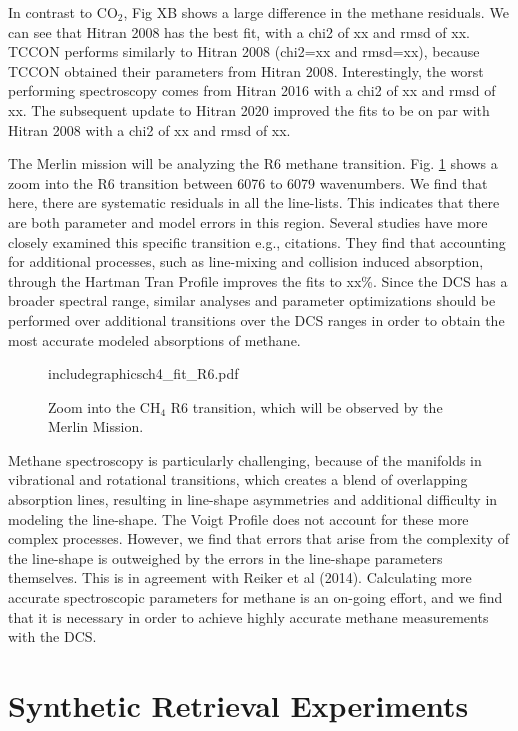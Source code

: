 \documentclass[amt, manuscript]{copernicus}
\begin{document}
In contrast to CO$_2$, Fig XB shows a large difference in the methane residuals. We can see that Hitran 2008 has the best fit, with a chi2 of xx and rmsd of xx. TCCON performs similarly to Hitran 2008 (chi2=xx and rmsd=xx), because TCCON obtained their parameters from Hitran 2008. Interestingly, the worst performing spectroscopy comes from Hitran 2016 with a chi2 of xx and rmsd of xx. The subsequent update to Hitran 2020 improved the fits to be on par with Hitran 2008 with a chi2 of xx and rmsd of xx.

The Merlin mission will be analyzing the R6 methane transition. Fig. \ref{fig:ch4_spectrum_r6} shows a zoom into the R6 transition between 6076 to 6079 wavenumbers. We find that here, there are systematic residuals in all the line-lists. This indicates that there are both parameter and model errors in this region. Several studies have more closely examined this specific transition e.g., citations. They find that accounting for additional processes, such as line-mixing and collision induced absorption, through the Hartman Tran Profile improves the fits to xx\%. Since the DCS has a broader spectral range, similar analyses and parameter optimizations should be performed over additional transitions over the DCS ranges in order to obtain the most accurate modeled absorptions of methane. 

\begin{figure}
  \centering
  includegraphics{ch4_fit_R6.pdf}
  \caption{Zoom into the CH$_4$ R6 transition, which will be observed by the Merlin Mission. }
  \label{fig:ch4_spectrum_r6}
\end{figure}
Methane spectroscopy is particularly challenging, because of the manifolds in vibrational and rotational transitions, which creates a blend of overlapping absorption lines, resulting in line-shape asymmetries and additional difficulty in modeling the line-shape. The Voigt Profile does not account for these more complex processes. However, we find that errors that arise from the complexity of the line-shape is outweighed by the errors in the line-shape parameters themselves. This is in agreement with Reiker et al (2014). Calculating more accurate spectroscopic parameters for methane is an on-going effort, and we find that it is necessary in order to achieve highly accurate methane measurements with the DCS.

\section{Synthetic Retrieval Experiments}
\end{document}

